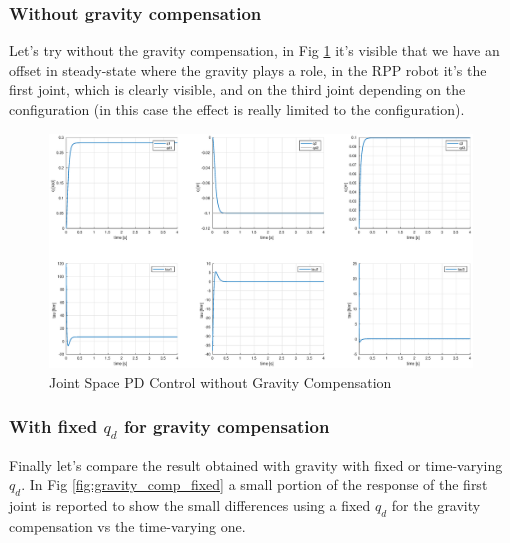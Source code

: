 \documentclass[a4paper,12pt]{article}
\begin{document}
\subsubsection{Without gravity compensation}
Let's try without the gravity compensation, in Fig \ref{fig:gravity_comp_no_gravity} it's visible that we have an offset in steady-state where the gravity plays a role, in the RPP robot it's the first joint, which is clearly visible, and on the third joint depending on the configuration (in this case the effect is really limited to the configuration).
\begin{figure}[H]
    \begin{center}
        \hspace*{-4.5cm}
        \includegraphics[scale=0.5]{images/gravity_comp_no_gravity.eps}
    \end{center}
    \caption{Joint Space PD Control without Gravity Compensation}
    \label{fig:gravity_comp_no_gravity}
\end{figure}

\newpage
\subsubsection{With fixed $q_d$ for gravity compensation}
Finally let's compare the result obtained with gravity with fixed or time-varying $q_d$. In Fig \ref{fig:gravity_comp_fixed} a small portion of the response of the first joint is reported to show the small differences using a fixed $q_d$ for the gravity compensation vs the time-varying one.
\end{document}
